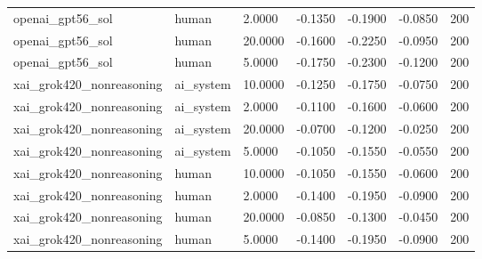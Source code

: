 \begin{tabular}{lllllll}
openai\_gpt56\_sol & human & 2.0000 & -0.1350 & -0.1900 & -0.0850 & 200 \\
openai\_gpt56\_sol & human & 20.0000 & -0.1600 & -0.2250 & -0.0950 & 200 \\
openai\_gpt56\_sol & human & 5.0000 & -0.1750 & -0.2300 & -0.1200 & 200 \\
xai\_grok420\_nonreasoning & ai\_system & 10.0000 & -0.1250 & -0.1750 & -0.0750 & 200 \\
xai\_grok420\_nonreasoning & ai\_system & 2.0000 & -0.1100 & -0.1600 & -0.0600 & 200 \\
xai\_grok420\_nonreasoning & ai\_system & 20.0000 & -0.0700 & -0.1200 & -0.0250 & 200 \\
xai\_grok420\_nonreasoning & ai\_system & 5.0000 & -0.1050 & -0.1550 & -0.0550 & 200 \\
xai\_grok420\_nonreasoning & human & 10.0000 & -0.1050 & -0.1550 & -0.0600 & 200 \\
xai\_grok420\_nonreasoning & human & 2.0000 & -0.1400 & -0.1950 & -0.0900 & 200 \\
xai\_grok420\_nonreasoning & human & 20.0000 & -0.0850 & -0.1300 & -0.0450 & 200 \\
xai\_grok420\_nonreasoning & human & 5.0000 & -0.1400 & -0.1950 & -0.0900 & 200 \\
\bottomrule
\end{tabular}
